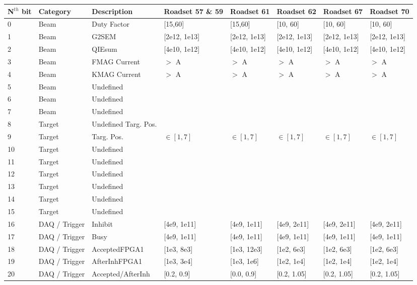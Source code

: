 \begin{table}
	\centering
	\begin{tabular}{llllllll}\toprule
		N$^{th}$ bit & Category & Description & Roadset 57 \& 59 & Roadset 61 & Roadset 62 & Roadset 67 & Roadset 70 \\\midrule
		0 & Beam & Duty Factor & [15,60] & [15,60] & [10, 60] & [10, 60] & [10, 60] \\
		1 & Beam & G2SEM &[2e12, 1e13] & [2e12, 1e13] & [2e12, 1e13] & [2e12, 1e13] & [2e12, 1e13] \\
		2 & Beam & QIEsum & [4e10, 1e12] & [4e10, 1e12] & [4e10, 1e12] & [4e10, 1e12] & [4e10, 1e12] \\
		3 & Beam & FMAG Current & $>$ \unit[1000]{A} & $>$ \unit[1000]{A} & $>$ \unit[1000]{A} & $>$ \unit[1000]{A} & $>$ \unit[1000]{A} \\
		4 & Beam & KMAG Current & $>$ \unit[1000]{A}  & $>$ \unit[1000]{A} & $>$ \unit[1000]{A} & $>$ \unit[1000]{A} & $>$ \unit[1000]{A} \\
		5 & Beam & Undefined & & & & & \\
		6 & Beam & Undefined & & & & & \\
		7 & Beam & Undefined & & & & & \\
		8 &  Target & Undefined Targ. Pos. & & & & & \\
		9 & Target & Targ. Pos. & $\in [1,7]$ & $\in [1,7]$ & $\in [1,7]$ & $\in [1,7]$ & $\in [1,7]$ \\
		10 & Target & Undefined & & & & & \\
		11 & Target & Undefined & & & & & \\
		12 & Target & Undefined & & & & & \\
		13 & Target & Undefined & & & & & \\
		14 & Target & Undefined & & & & & \\
		15 & Target & Undefined & & & & & \\
		16 & DAQ / Trigger & Inhibit & [4e9, 1e11] & [4e9, 1e11] & [4e9, 2e11] & [4e9, 2e11] & [4e9, 2e11] \\
		17 & DAQ / Trigger & Busy & [4e9, 1e11] & [4e9, 1e11] & [4e9, 1e11] & [4e9, 1e11] & [4e9, 1e11] \\
		18 & DAQ / Trigger & AcceptedFPGA1 & [1e3, 8e3] & [1e3, 12e3] & [1e2, 6e3] & [1e2, 6e3] & [1e2, 6e3] \\
		19 & DAQ / Trigger & AfterInhFPGA1 & [1e3, 3e4] & [1e3, 1e6] & [1e2, 1e4] & [1e2, 1e4] & [1e2, 1e4] \\
		20 & DAQ / Trigger & Accepted/AfterInh & [0.2, 0.9] & [0.0, 0.9] & [0.2, 1.05] & [0.2, 1.05] & [0.2, 1.05] \\

\end{tabular}
\end{table}
